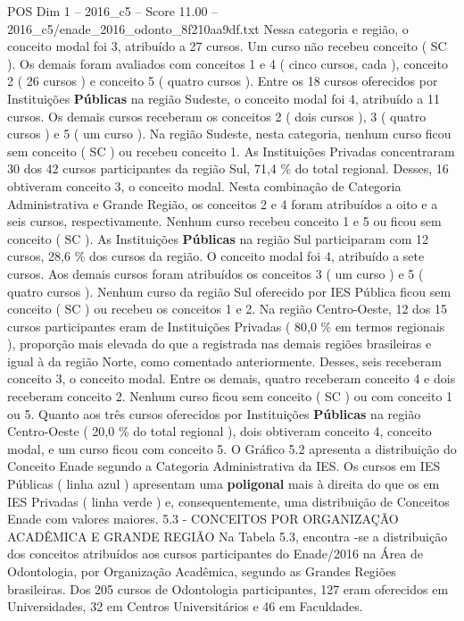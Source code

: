 \begin{textsample}{POS Dim 1 – 2016\_c5 – Score 11.00 – 2016\_c5/enade\_2016\_odonto\_8f210aa9df.txt}
Nessa categoria e região, o conceito modal foi 3, atribuído a 27 cursos.
Um curso não recebeu conceito ( SC ).
Os demais foram avaliados com conceitos 1 e 4 ( cinco cursos, cada ), conceito 2 ( 26 cursos ) e conceito 5 ( quatro cursos ).
Entre os 18 cursos oferecidos por Instituições \textbf{Públicas} na região Sudeste, o conceito modal foi 4, atribuído a 11 cursos.
Os demais cursos receberam os conceitos 2 ( dois cursos ), 3 ( quatro cursos ) e 5 ( um curso ).
Na região Sudeste, nesta categoria, nenhum curso ficou sem conceito ( SC ) ou recebeu conceito 1.
As Instituições Privadas concentraram 30 dos 42 cursos participantes da região Sul, 71,4 \% do total regional.
Desses, 16 obtiveram conceito 3, o conceito modal.
Nesta combinação de Categoria Administrativa e Grande Região, os conceitos 2 e 4 foram atribuídos a oito e a seis cursos, respectivamente.
Nenhum curso recebeu conceito 1 e 5 ou ficou sem conceito ( SC ).
As Instituições \textbf{Públicas} na região Sul participaram com 12 cursos, 28,6 \% dos cursos da região.
O conceito modal foi 4, atribuído a sete cursos.
Aos demais cursos foram atribuídos os conceitos 3 ( um curso ) e 5 ( quatro cursos ).
Nenhum curso da região Sul oferecido por IES Pública ficou sem conceito ( SC ) ou recebeu os conceitos 1 e 2.
Na região Centro-Oeste, 12 dos 15 cursos participantes eram de Instituições Privadas ( 80,0 \% em termos regionais ), proporção mais elevada do que a registrada nas demais regiões brasileiras e igual à da região Norte, como comentado anteriormente.
Desses, seis receberam conceito 3, o conceito modal.
Entre os demais, quatro receberam conceito 4 e dois receberam conceito 2.
Nenhum curso ficou sem conceito ( SC ) ou com conceito 1 ou 5.
Quanto aos três cursos oferecidos por Instituições \textbf{Públicas} na região Centro-Oeste ( 20,0 \% do total regional ), dois obtiveram conceito 4, conceito modal, e um curso ficou com conceito 5.
O Gráfico 5.2 apresenta a distribuição do Conceito Enade segundo a Categoria Administrativa da IES.
Os cursos em IES Públicas ( linha azul ) apresentam uma \textbf{poligonal} mais à direita do que os em IES Privadas ( linha verde ) e, consequentemente, uma distribuição de Conceitos Enade com valores maiores. 5.3 - CONCEITOS POR ORGANIZAÇÃO ACADÊMICA E GRANDE REGIÃO Na Tabela 5.3, encontra -se a distribuição dos conceitos atribuídos aos cursos participantes do Enade/2016 na Área de Odontologia, por Organização Acadêmica, segundo as Grandes Regiões brasileiras.
Dos 205 cursos de Odontologia participantes, 127 eram oferecidos em Universidades, 32 em Centros Universitários e 46 em Faculdades.

\end{textsample}

